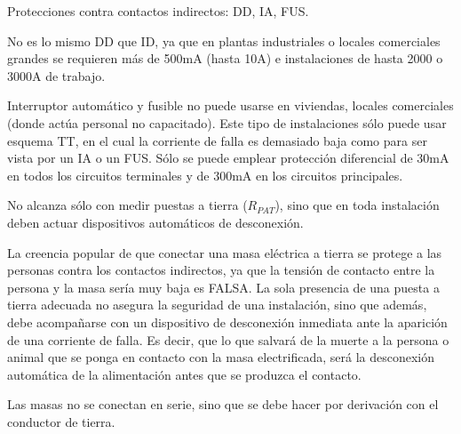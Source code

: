 Protecciones contra contactos indirectos: DD, IA, FUS.

No es lo mismo DD que ID, ya que en plantas industriales o locales comerciales grandes se requieren más de 500mA (hasta 10A) e instalaciones de hasta 2000 o 3000A de trabajo.

Interruptor automático y fusible no puede usarse en viviendas, locales comerciales (donde actúa personal no capacitado). Este tipo de instalaciones sólo puede usar esquema TT, en el cual la corriente de falla es demasiado baja como para ser vista por un IA o un FUS. Sólo se puede emplear protección diferencial de 30mA en todos los circuitos terminales y de 300mA en los circuitos principales.

No alcanza sólo con medir puestas a tierra ($R_{PAT}$), sino que en toda instalación deben actuar dispositivos automáticos de desconexión.

La creencia popular de que conectar una masa eléctrica a tierra se protege a las personas contra los contactos indirectos, ya que la tensión de contacto entre la persona y la masa sería muy baja es FALSA. La sola presencia de una puesta a tierra adecuada no asegura la seguridad de una instalación, sino que además, debe acompañarse con un dispositivo de desconexión inmediata ante la aparición de una corriente de falla. Es decir, que lo que salvará de la muerte a la persona o animal que se ponga en contacto con la masa electrificada, será la desconexión automática de la alimentación antes que se produzca el contacto.


Las masas no se conectan en serie, sino que se debe hacer por derivación con el conductor de tierra.


